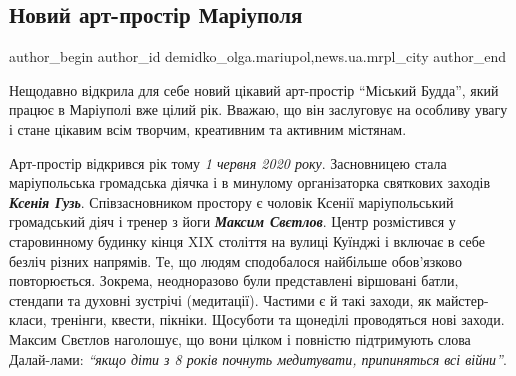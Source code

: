  
 
 
 
 
 
\subsection{Новий арт-простір Маріуполя}
\label{sec:19_05_2021.stz.news.ua.mrpl_city.1.novyj_art_prostir_mrpl}
 
\ifcmt
 author_begin
   author_id demidko_olga.mariupol,news.ua.mrpl_city
 author_end
\fi


Нещодавно відкрила для себе новий цікавий арт-простір \enquote{Міський Будда}, який
працює в Маріуполі вже цілий рік. Вважаю, що він заслуговує на особливу увагу і
стане цікавим всім творчим, креативним та активним містянам.

Арт-простір відкрився рік тому \emph{1 червня 2020 року}. Засновницею стала
маріупольська громадська діячка і в минулому організаторка святкових заходів
\emph{\textbf{Ксенія Гузь}}. Співзасновником простору є чоловік Ксенії маріупольський
громадський діяч і тренер з йоги \emph{\textbf{Максим Свєтлов}}. Центр розмістився у
старовинному будинку кінця XIX століття на вулиці Куїнджі і включає в себе
безліч різних напрямів. Те, що людям сподобалося найбільше обов'язково
повторюється. Зокрема, неодноразово були представлені віршовані батли, стендапи
та духовні зустрічі (медитації). Частими є й такі заходи, як майстер-класи,
тренінги, квести, пікніки. Щосуботи та щонеділі проводяться нові заходи. Максим
Свєтлов наголошує, що вони цілком і повністю підтримують слова Далай-лами:
\emph{\enquote{якщо діти з 8 років почнуть медитувати, припиняться всі війни}}. 


